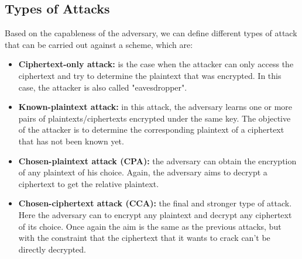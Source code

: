 \begin{nopbreak}
    \subsection{Types of Attacks}
    Based on the capableness of the adversary, we can define different types of attack that can be carried out against a scheme, which are:
    \begin{itemize}
        \item{\textbf{Ciphertext-only attack:} is the case when the attacker can only access the ciphertext and try to determine the plaintext that was encrypted. In this case, the attacker is also called "eavesdropper".}
        \item{\textbf{Known-plaintext attack:} in this attack, the adversary learns one or more pairs of plaintexts/ciphertexts encrypted under the same key. The objective of the attacker is to determine the corresponding plaintext of a ciphertext that has not been known yet.}
        \item{\textbf{Chosen-plaintext attack (CPA):} the adversary can obtain the encryption of any plaintext of his choice. Again, the adversary aims to decrypt a ciphertext to get the relative plaintext.}
        \item{\textbf{Chosen-ciphertext attack (CCA):} the final and stronger type of attack. Here the adversary can to encrypt any plaintext and decrypt any ciphertext of its choice. Once again the aim is the same as the previous attacks, but with the constraint that the ciphertext that it wants to crack can't be directly decrypted.}
    \end{itemize}
\end{nopbreak}
